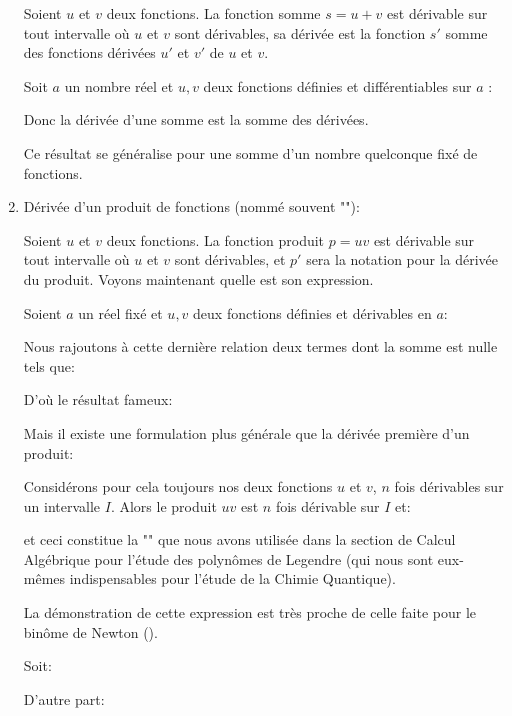 \begin{enumerate}
		 Soient $u$ et $v$ deux fonctions. La fonction somme $s=u+v$ est dérivable sur tout intervalle où $u$ et $v$ sont dérivables, sa dérivée est la fonction $s'$ somme des fonctions dérivées $u'$ et $v'$ de $u$ et $v$.
		 
		 Soit $a$ un nombre réel et $u,v$ deux fonctions définies et différentiables sur $a$ :
		 
		 
		 Donc la dérivée d'une somme est la somme des dérivées.
		 
		 Ce résultat se généralise pour une somme d'un nombre quelconque fixé de fonctions.
		 
		 \item Dérivée d'un produit de fonctions (nommé souvent ""):
		 
		 Soient $u$ et $v$ deux fonctions. La fonction produit $p=uv$ est dérivable sur tout intervalle où $u$ et $v$ sont dérivables, et $p'$ sera la notation pour la dérivée du produit. Voyons maintenant quelle est son expression.
		 
		 Soient $a$ un réel fixé et $u,v$ deux fonctions définies et dérivables en $a$:		 
		 
		 Nous rajoutons à cette dernière relation deux termes dont la somme est nulle tels que:
		 
		D'où le résultat fameux:
		
		Mais il existe une formulation plus générale que la dérivée première d'un produit:
		 \begin{theorem}
		 	Considérons pour cela toujours nos deux fonctions $u$ et $v$, $n$ fois dérivables sur un intervalle $I$. Alors le produit $uv$ est $n$ fois dérivable sur $I$ et:
		 	
		 	et ceci constitue la "\label{Leibniz differentiation rule for products}" que nous avons utilisée dans la section de Calcul Algébrique pour l'étude des polynômes de Legendre (qui nous sont eux-mêmes indispensables pour l'étude de la Chimie Quantique).
		 	
		 	La démonstration de cette expression est très proche de celle faite pour le binôme de Newton ().
		 \end{theorem}
		 \begin{dem}
		 	Soit:
		 	
		 	D'autre part:
		 	

\end{dem}
\end{enumerate}
